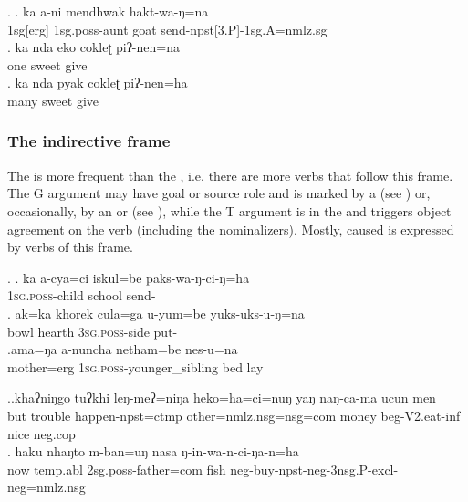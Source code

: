\ex. \ag. ka  a-ni mendhwak hakt-wa-ŋ=na\\
{\sc 1sg[erg]} {\sc 1sg.poss}-aunt goat send{\sc -npst[3.P]-1sg.A=nmlz.sg}\\
\bg. ka nda eko cokleʈ piʔ-nen=na\\
		  one sweet give\\
	\bg. ka nda pyak cokleʈ piʔ-nen=ha\\
	  many sweet give\\

\subsubsection{The indirective frame}


\noindent
The  is more frequent than the , i.e. there are more verbs that follow this frame. The G argument may have goal or source role and is marked by a  (see \Next) or, occasionally, by an  or   (see \NNext), while the T argument is in the  and triggers object agreement on the verb (including the nominalizers). Mostly, caused  is  expressed by verbs of this frame. 

\ex. \ag. ka a-cya=ci iskul=be paks-wa-ŋ-ci-ŋ=ha \\
		 \textsc{1sg.poss}-child school send-	\\
		\bg. ak=ka khorek cula=ga u-yum=be yuks-uks-u-ŋ=na\\
	 bowl hearth \textsc{3sg.poss}-side put-	\\
\bg.ama=ŋa a-nuncha netham=be nes-u=na\\
mother{\sc =erg} \textsc{1sg.poss}-younger\_sibling  bed lay	\\
	
 
\ex.\ag.khaʔniŋgo tuʔkhi leŋ-meʔ=niŋa                heko=ha=ci=nuŋ               yaŋ  naŋ-ca-ma        ucun men\\
but        trouble happen{\sc [3sg]-npst=ctmp} other{\sc=nmlz.nsg=nsg=com}  money beg{\sc-V2.eat-inf } nice {\sc neg.cop}\\
 
		\bg. haku nhaŋto    m-ban=uŋ                nasa ŋ-in-wa-n-ci-ŋa-n=ha\\
		now {\sc temp.abl} {\sc 2sg.poss-}father{\sc =com} fish {\sc neg-}buy{\sc -npst-neg-3nsg.P-excl-neg=nmlz.nsg}\\
		 


